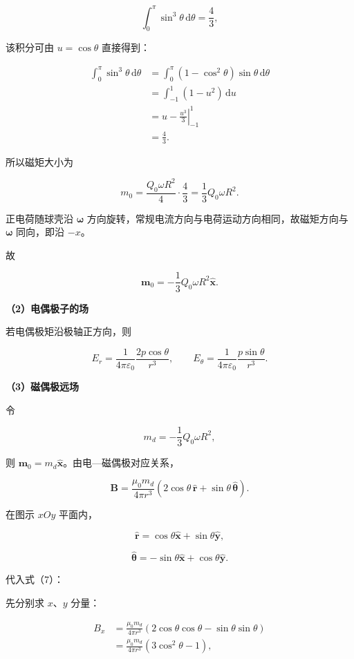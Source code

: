 \documentclass[12pt,a4paper,UTF8]{ctexart}
\begin{document}
\[\int_0^\pi\sin^3\theta\,\mathrm d\theta=\frac43,\]

该积分可由 \(u=\cos\theta\) 直接得到：

\[\begin{aligned}
\int_0^\pi\sin^3\theta\,\mathrm d\theta
&=\int_0^\pi(1-\cos^2\theta)\sin\theta\,\mathrm d\theta\\
&=\int_{-1}^{1}(1-u^2)\,\mathrm du\\
&=\left.u-\frac{u^3}{3}\right|_{-1}^{1}\\
&=\frac43.
\end{aligned}\]

所以磁矩大小为

\[m_0=\frac{Q_0\omega R^2}{4}\cdot\frac43
=\frac13Q_0\omega R^2.\]

正电荷随球壳沿 \(\boldsymbol\omega\)
方向旋转，常规电流方向与电荷运动方向相同，故磁矩方向与
\(\boldsymbol\omega\) 同向，即沿 \(-x\)。

故

\[\boxed{
\boldsymbol m_0=-\frac13Q_0\omega R^2\hat{\boldsymbol x}
}. \tag{5}\]

\textbf{（2）电偶极子的场}

若电偶极矩沿极轴正方向，则

\[\boxed{
E_r=\frac1{4\pi\varepsilon_0}\frac{2p\cos\theta}{r^3},
\qquad
E_\theta=\frac1{4\pi\varepsilon_0}\frac{p\sin\theta}{r^3}
}. \tag{6}\]

\textbf{（3）磁偶极远场}

令

\[m_d=-\frac13Q_0\omega R^2,\]

则 \(\boldsymbol m_0=m_d\hat{\boldsymbol x}\)。由电---磁偶极对应关系，

\[\boxed{
\boldsymbol B
=\frac{\mu_0m_d}{4\pi r^3}
\left(2\cos\theta\,\hat{\boldsymbol r}
+\sin\theta\,\hat{\boldsymbol\theta}\right)
}. \tag{7}\]

在图示 \(xOy\) 平面内，

\[\hat{\boldsymbol r}=\cos\theta\hat{\boldsymbol x}
+\sin\theta\hat{\boldsymbol y},\]

\[\hat{\boldsymbol\theta}=-\sin\theta\hat{\boldsymbol x}
+\cos\theta\hat{\boldsymbol y}.\]

代入式（7）：

先分别求 \(x\)、\(y\) 分量：

\[\begin{aligned}
B_x
&=\frac{\mu_0m_d}{4\pi r^3}
\left(2\cos\theta\cos\theta
-\sin\theta\sin\theta\right)\\
&=\frac{\mu_0m_d}{4\pi r^3}(3\cos^2\theta-1),
\end{aligned}\]
\end{document}
